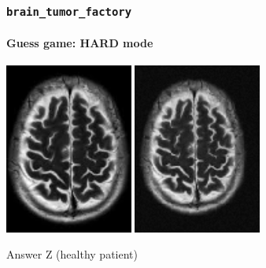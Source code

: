 \documentclass[]{beamer}
\newcommand{\btf}{\tt{brain\_tumor\_factory}}
\begin{document}
\begin{frame}
  \frametitle{\btf}
  \framesubtitle{Guess game: HARD mode}
  \begin{minipage}{\linewidth}
    \begin{center}
      \includegraphics[width=4.2cm]{resources/brain_base}
      \includegraphics[width=4.2cm]{resources/z4}
    \end{center}
  \end{minipage}
  \pause
  \begin{block}{Answer}
    Z (healthy patient)
  \end{block}
\end{frame}
\end{document}
